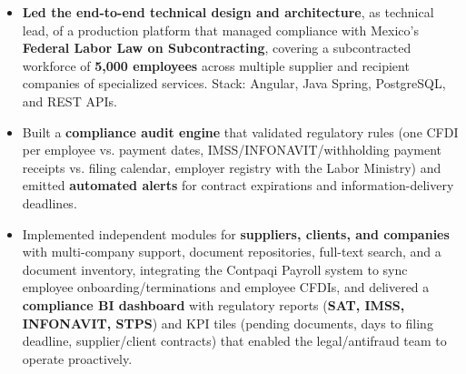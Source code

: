 {
\begin{itemize}
    \item \textbf{Led the end-to-end technical design and architecture}, as technical lead, of a production platform that managed compliance with Mexico's \textbf{Federal Labor Law on Subcontracting}, covering a subcontracted workforce of \textbf{5{,}000 employees} across multiple supplier and recipient companies of specialized services. Stack: Angular, Java Spring, PostgreSQL, and REST APIs.
    \item Built a \textbf{compliance audit engine} that validated regulatory rules (one CFDI per employee vs. payment dates, IMSS/INFONAVIT/withholding payment receipts vs. filing calendar, employer registry with the Labor Ministry) and emitted \textbf{automated alerts} for contract expirations and information-delivery deadlines.
    \item Implemented independent modules for \textbf{suppliers, clients, and companies} with multi-company support, document repositories, full-text search, and a document inventory, integrating the Contpaqi Payroll system to sync employee onboarding/terminations and employee CFDIs, and delivered a \textbf{compliance BI dashboard} with regulatory reports (\textbf{SAT, IMSS, INFONAVIT, STPS}) and KPI tiles (pending documents, days to filing deadline, supplier/client contracts) that enabled the legal/antifraud team to operate proactively.
\end{itemize}
}

